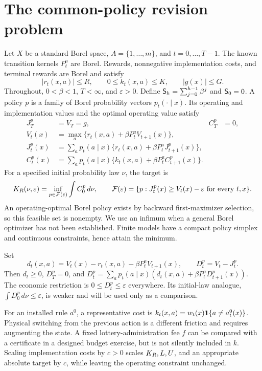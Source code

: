 \section{The common-policy revision problem}\label{sec:model48}
Let $X$ be a standard Borel space, $A=\{1,\ldots,m\}$, and $t=0,\ldots,T-1$. The known transition kernels $P_t^a$ are Borel. Rewards, nonnegative implementation costs, and terminal rewards are Borel and satisfy
\[
 |r_t(x,a)|\le R,\qquad 0\le k_t(x,a)\le K,\qquad |g(x)|\le G.
\]
Throughout, $0<\beta<1$, $T<\infty$, and $\varepsilon>0$. Define $\mathsf S_{h}=\sum_{j=0}^{h-1}\beta^j$ and $\mathsf S_{0}=0$. A policy $p$ is a family of Borel probability vectors $p_t(\cdot\mid x)$. Its operating and implementation values and the optimal operating value satisfy
\begin{align}
 J_T^p&=V_T=g,& C_T^p&=0,\nonumber\\
 V_t(x)&=\max_a\{r_t(x,a)+\beta P_t^aV_{t+1}(x)\},\label{eq:value48}\\
 J_t^p(x)&=\sum_a p_t(a\mid x)\{r_t(x,a)+\beta P_t^aJ_{t+1}^p(x)\},\label{eq:policy48}\\
 C_t^p(x)&=\sum_a p_t(a\mid x)\{k_t(x,a)+\beta P_t^aC_{t+1}^p(x)\}.\nonumber
\end{align}
For a specified initial probability law $\nu$, the target is
\begin{equation}\label{eq:target48}
 K_R(\nu,\varepsilon)=\inf_{p\in\mathcal F(\varepsilon)}\int C_0^p\,d\nu,
 \qquad \mathcal F(\varepsilon)=\{p:J_t^p(x)\ge V_t(x)-\varepsilon\text{ for every }t,x\}.
\end{equation}
An operating-optimal Borel policy exists by backward first-maximizer selection, so this feasible set is nonempty. We use an infimum when a general Borel optimizer has not been established. Finite models have a compact policy simplex and continuous constraints, hence attain the minimum.

Set
\begin{equation}\label{eq:regret48}
 d_t(x,a)=V_t(x)-r_t(x,a)-\beta P_t^aV_{t+1}(x),\qquad D_t^p=V_t-J_t^p.
\end{equation}
Then $d_t\ge0$, $D_T^p=0$, and $D_t^p=\sum_a p_t(a\mid x)(d_t(x,a)+\beta P_t^aD_{t+1}^p(x))$. The economic restriction is $0\le D_t^p\le\varepsilon$ everywhere. Its initial-law analogue, $\int D_0^p\,d\nu\le\varepsilon$, is weaker and will be used only as a comparison.

For an installed rule $a^0$, a representative cost is $k_t(x,a)=w_t(x)\mathbf 1\{a\ne a_t^0(x)\}$. Physical switching from the previous action is a different friction and requires augmenting the state. A fixed lottery-administration fee $f$ can be compared with a certificate in a designed budget exercise, but is not silently included in $k$. Scaling implementation costs by $c>0$ scales $K_R,L,U$, and an appropriate absolute target by $c$, while leaving the operating constraint unchanged.
